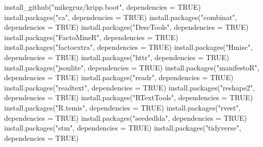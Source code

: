 \documentclass[
]{book}
\newenvironment{Shaded}{\begin{snugshade}}{\end{snugshade}}
\newcommand{\AttributeTok}[1]{\textcolor[rgb]{0.77,0.63,0.00}{#1}}
\newcommand{\ConstantTok}[1]{\textcolor[rgb]{0.00,0.00,0.00}{#1}}
\newcommand{\FunctionTok}[1]{\textcolor[rgb]{0.00,0.00,0.00}{#1}}
\newcommand{\NormalTok}[1]{#1}
\newcommand{\StringTok}[1]{\textcolor[rgb]{0.31,0.60,0.02}{#1}}
\begin{document}
\begin{Shaded}
\begin{Highlighting}[]
\FunctionTok{install\_github}\NormalTok{(}\StringTok{"mikegruz/kripp.boot"}\NormalTok{, }\AttributeTok{dependencies =} \ConstantTok{TRUE}\NormalTok{)}
\FunctionTok{install.packages}\NormalTok{(}\StringTok{"ca"}\NormalTok{, }\AttributeTok{dependencies =} \ConstantTok{TRUE}\NormalTok{)}
\FunctionTok{install.packages}\NormalTok{(}\StringTok{"combinat"}\NormalTok{, }\AttributeTok{dependencies =} \ConstantTok{TRUE}\NormalTok{)}
\FunctionTok{install.packages}\NormalTok{(}\StringTok{"DescTools"}\NormalTok{, }\AttributeTok{dependencies =} \ConstantTok{TRUE}\NormalTok{)}
\FunctionTok{install.packages}\NormalTok{(}\StringTok{"FactoMineR"}\NormalTok{, }\AttributeTok{dependencies =} \ConstantTok{TRUE}\NormalTok{)}
\FunctionTok{install.packages}\NormalTok{(}\StringTok{"factoextra"}\NormalTok{, }\AttributeTok{dependencies =} \ConstantTok{TRUE}\NormalTok{)}
\FunctionTok{install.packages}\NormalTok{(}\StringTok{"Hmisc"}\NormalTok{, }\AttributeTok{dependencies =} \ConstantTok{TRUE}\NormalTok{)}
\FunctionTok{install.packages}\NormalTok{(}\StringTok{"httr"}\NormalTok{, }\AttributeTok{dependencies =} \ConstantTok{TRUE}\NormalTok{)}
\FunctionTok{install.packages}\NormalTok{(}\StringTok{"jsonlite"}\NormalTok{, }\AttributeTok{dependencies =} \ConstantTok{TRUE}\NormalTok{)}
\FunctionTok{install.packages}\NormalTok{(}\StringTok{"manifestoR"}\NormalTok{, }\AttributeTok{dependencies =} \ConstantTok{TRUE}\NormalTok{)}
\FunctionTok{install.packages}\NormalTok{(}\StringTok{"readr"}\NormalTok{, }\AttributeTok{dependencies =} \ConstantTok{TRUE}\NormalTok{)}
\FunctionTok{install.packages}\NormalTok{(}\StringTok{"readtext"}\NormalTok{, }\AttributeTok{dependencies =} \ConstantTok{TRUE}\NormalTok{)}
\FunctionTok{install.packages}\NormalTok{(}\StringTok{"reshape2"}\NormalTok{, }\AttributeTok{dependencies =} \ConstantTok{TRUE}\NormalTok{)}
\FunctionTok{install.packages}\NormalTok{(}\StringTok{"RTextTools"}\NormalTok{, }\AttributeTok{dependencies =} \ConstantTok{TRUE}\NormalTok{)}
\FunctionTok{install.packages}\NormalTok{(}\StringTok{"R.temis"}\NormalTok{, }\AttributeTok{dependencies =} \ConstantTok{TRUE}\NormalTok{)}
\FunctionTok{install.packages}\NormalTok{(}\StringTok{"rvest"}\NormalTok{, }\AttributeTok{dependencies =} \ConstantTok{TRUE}\NormalTok{)}
\FunctionTok{install.packages}\NormalTok{(}\StringTok{"seededlda"}\NormalTok{, }\AttributeTok{dependencies =} \ConstantTok{TRUE}\NormalTok{)}
\FunctionTok{install.packages}\NormalTok{(}\StringTok{"stm"}\NormalTok{, }\AttributeTok{dependencies =} \ConstantTok{TRUE}\NormalTok{)}
\FunctionTok{install.packages}\NormalTok{(}\StringTok{"tidyverse"}\NormalTok{, }\AttributeTok{dependencies =} \ConstantTok{TRUE}\NormalTok{)}
\end{Highlighting}
\end{Shaded}
\end{document}

